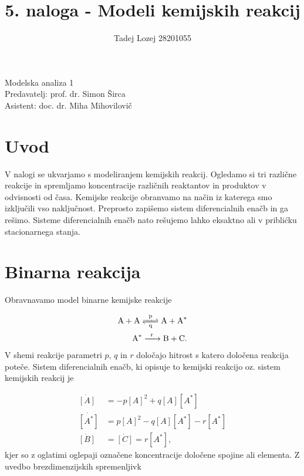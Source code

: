 \documentclass[slovene,11pt,a4paper]{article}
\begin{document}
\title{5. naloga - Modeli kemijskih reakcij}
\author{Tadej Lozej 28201055}
\maketitle
\begin{center}
Modelska analiza 1 \\
\bigskip
Predavatelj: prof. dr. Simon Širca \\
Asistent: doc. dr. Miha Mihovilovič
\end{center}

\newpage

\tableofcontents

\newpage

\section{Uvod}


V nalogi se ukvarjamo s modeliranjem kemijskih reakcij. Ogledamo si tri različne reakcije in spremljamo koncentracije različnih reaktantov in produktov v odvisnosti od časa. Kemijske reakcije obranvamo na način iz katerega smo izključili vso naključnost. Preprosto zapišemo sistem diferencialnih enačb in ga rešimo. Sisteme diferencialnih enačb nato rešujemo lahko eksaktno ali v priblićku stacionarnega stanja.

\section{Binarna reakcija}

Obravnavamo model binarne kemijske reakcije

\begin{align}
\ce{A + A <=>[p][q] A + A^*} \\
\ce{A^* ->[r] B + C}.
\end{align}
V shemi reakcije parametri $p$, $q$ in $r$ določajo hitrost s katero določena reakcija poteče. Sistem diferencialnih enačb, ki opisuje to kemijski reakcijo oz. sistem kemijskih reakcij je

\begin{align}
\dot{[A]} &= -p [A]^2 + q[A][A^*] \\
\dot{[A^*]} &= p [A]^2 - q [A][A^*] - r[A^*] \\
\dot{[B]} &= \dot{[C]} = r [A^*],
\end{align}
kjer so z oglatimi oglepaji označene koncentracije določene spojine ali elementa. Z uvedbo brezdimenzijskih spremenljivk
\end{document}
